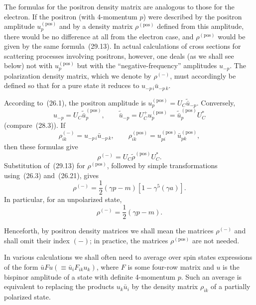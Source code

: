 The formulas for the positron density matrix are analogous to those for the electron. If the positron (with 4-momentum $p$) were described by the positron amplitude $u_p^{(\text{pos})}$ and by a density matrix $\rho^{(\text{pos})}$ defined from this amplitude, there would be no difference at all from the electron case, and $\rho^{(\text{pos})}$ would be given by the same formula~(29.13). In actual calculations of cross sections for scattering processes involving positrons, however, one deals (as we shall see below) not with $u_p^{(\text{pos})}$ but with the ``negative-frequency'' amplitudes $u_{-p}$. The polarization density matrix, which we denote by $\rho^{(-)}$, must accordingly be defined so that for a pure state it reduces to $u_{-p\,i}\bar u_{-p\,k}$.

According to~(26.1), the positron amplitude is $u_p^{(\text{pos})} = U_C\widetilde{\bar u}_{-p}$. Conversely,
\[
u_{-p} = U_C\widetilde{\bar u}_p^{(\text{pos})},\qquad
\widetilde{\bar u}_{-p} = U_C^+u_p^{(\text{pos})} = \widetilde{\bar u}_p^{(\text{pos})}U_C^*
\]
(compare~(28.3)). If
\[
\rho^{(-)}_{ik} = u_{-p\,i}\bar u_{-p\,k},\qquad \rho^{(\text{pos})}_{ik} = u^{(\text{pos})}_{pi}\bar u^{(\text{pos})}_{pk},
\]
then these formulas give
\begin{equation}
\rho^{(-)} = U_C\widetilde\rho^{(\text{pos})}U_C^*.
\tag{29.15}
\end{equation}
Substitution of~(29.13) for $\rho^{(\text{pos})}$, followed by simple transformations using~(26.3) and~(26.21), gives
\begin{equation}
\rho^{(-)} = \frac{1}{2}(\gamma p - m)[1 - \gamma^5(\gamma a)].
\tag{29.16}
\end{equation}
In particular, for an unpolarized state,
\begin{equation}
\rho^{(-)} = \frac{1}{2}(\gamma p - m).
\tag{29.17}
\end{equation}

Henceforth, by positron density matrices we shall mean the matrices $\rho^{(-)}$ and shall omit their index $(-)$; in practice, the matrices $\rho^{(\text{pos})}$ are not needed.

In various calculations we shall often need to average over spin states expressions of the form $\bar u Fu(\equiv \bar u_i F_{ik} u_k)$, where $F$ is some four-row matrix and $u$ is the bispinor amplitude of a state with definite 4-momentum $p$. Such an average is equivalent to replacing the products $u_k\bar u_i$ by the density matrix $\rho_{ik}$ of a partially polarized state.


